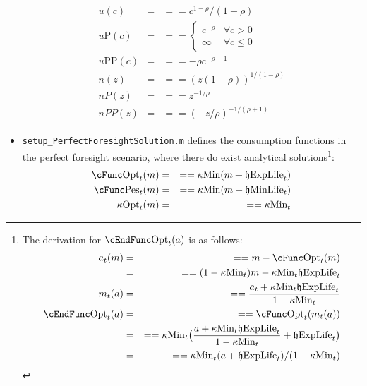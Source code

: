 \documentclass[titlepage,abstract]{\econtex}
\providecommand{\kappaMin}{\kappa\text{Min}}
\providecommand{\cFuncOpt}{\cFunc\text{Opt}}
\providecommand{\cFuncPes}{\cFunc\text{Pes}}
\providecommand{\cEndFuncOpt}{\cEndFunc\text{Opt}}
\providecommand{\kappaOpt}{\kappa\text{Opt}}
\providecommand{\hEndExpLife}{\mathfrak{h}\text{ExpLife}}
\providecommand{\hEndMinLife}{\mathfrak{h}\text{MinLife}}
\providecommand{\uP}{u\text{P}}
\providecommand{\uPP}{u\text{PP}}
\begin{document}
\begin{itemize}
\begin{equation}
\begin{gathered}
\begin{aligned}
      u(c)   &=& =  =  c^{1-\rho}/(1-\rho) \\
      \uP(c)   &=& =  = 
      \begin{cases}
      c^{-\rho} & \forall c>0 \\
      \infty & \forall c \leq 0
      \end{cases} \\
      \uPP(c)   &=& =  =  -\rho c^{-\rho-1} \\
      n(z)   &=& =  =  (z(1-\rho))^{1/(1-\rho)} \\
      nP(z)   &=& =  =  z^{-1/\rho} \\
      nPP(z)   &=& =  =  (-z/\rho)^{-1/(\rho+1)}
      \end{aligned}\end{gathered}\end{equation}
      \item \texttt{setup\_PerfectForesightSolution.m} defines the consumption functions in the perfect foresight scenario, where there do exist analytical solutions\footnote{
          The derivation for $\cEndFuncOpt_{t}(a)$ is as follows:
          \begin{equation}\begin{gathered}\begin{aligned}
          a_{t}(m)   &=& =  =  m-\cFuncOpt_{t}(m) \\
            &=& =  =  (1-\kappaMin_{t}) m -\kappaMin_{t} \hEndExpLife_{t} \\
          m_{t} (a)   &=& =  =  \frac{a_{t}+ \kappaMin_{t}\hEndExpLife_{t}}{1-\kappaMin_{t}} \\
          \cEndFuncOpt_{t} (a)   &=& =  =  \cFuncOpt_{t}(m_{t}(a)) \\
            &=& =  =  \kappaMin_{t} \big(\frac{a+ \kappaMin_{t}\hEndExpLife_{t}}{1-\kappaMin_{t}} + \hEndExpLife_{t}\big) \\
            &=& =  =  \kappaMin_{t} (a+ \hEndExpLife_{t})/(1-\kappaMin_{t})
          \end{aligned}\end{gathered}\end{equation}
          }:
          \begin{equation}\begin{gathered}\begin{aligned}
          \cFuncOpt_{t}(m)   &=& =  =  \kappaMin (m+\hEndExpLife_{t}) \\
          \cFuncPes_{t}(m)   &=& =  =  \kappaMin (m+\hEndMinLife_{t}) \\
          \kappaOpt_{t}(m)   &=& =  =  \kappaMin_{t} \\

\end{aligned}
\end{gathered}
\end{equation}
\end{itemize}
\end{document}
